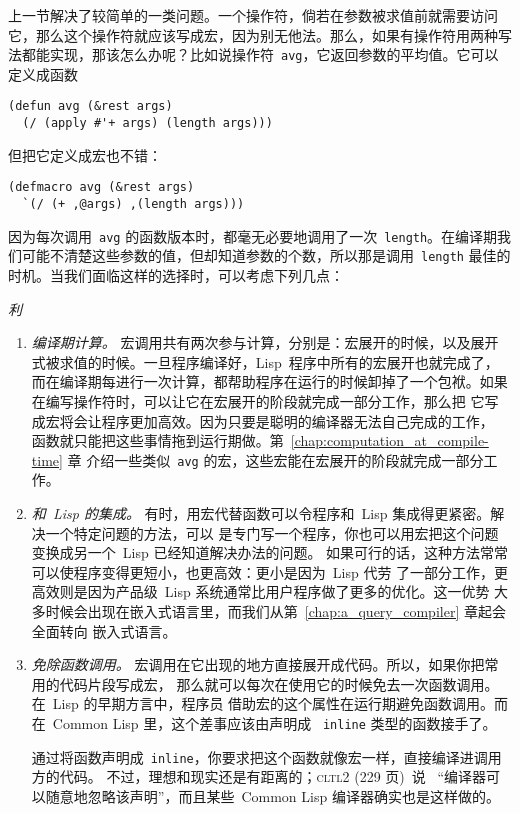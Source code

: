 上一节解决了较简单的一类问题。一个操作符，倘若在参数被求值前就需要访问它，那么这个操作符就应该写成宏，因为别无他法。那么，如果有操作符用两种写法都能实现，那该怎么办呢？比如说操作符~\verb|avg|，它返回参数的平均值。它可以定义成函数
\begin{lstlisting}
(defun avg (&rest args)
  (/ (apply #'+ args) (length args)))
\end{lstlisting}
但把它定义成宏也不错：
\begin{lstlisting}
(defmacro avg (&rest args)
  `(/ (+ ,@args) ,(length args)))
\end{lstlisting}
因为每次调用~\verb|avg| 的函数版本时，都毫无必要地调用了一次~\verb|length|。在编译期我们可能不清楚这些参数的值，但却知道参数的个数，所以那是调用~\verb|length| 最佳的时机。当我们面临这样的选择时，可以考虑下列几点：

\begin{center}\large\textsl{利}\end{center}

\begin{enumerate}
\item \emph{编译期计算。}
  宏调用共有两次参与计算，分别是：宏展开的时候，以及展开式被求值的时候。一旦程序编译好，Lisp~程序中所有的宏展开也就完成了，而在编译期每进行一次计算，都帮助程序在运行的时候卸掉了一个包袱。如果在编写操作符时，可以让它在宏展开的阶段就完成一部分工作，那么把
  它写成宏将会让程序更加高效。因为只要是聪明的编译器无法自己完成的工作，
  函数就只能把这些事情拖到运行期做。第~\ref{chap:computation_at_compile-time} 章
  介绍一些类似~\texttt{avg} 的宏，这些宏能在宏展开的阶段就完成一部分工作。
\item \emph{和~Lisp 的集成。}
  有时，用宏代替函数可以令程序和~Lisp 集成得更紧密。解决一个特定问题的方法，可以
  是专门写一个程序，你也可以用宏把这个问题变换成另一个~Lisp 已经知道解决办法的问题。
  如果可行的话，这种方法常常可以使程序变得更短小，也更高效：更小是因为~Lisp 代劳
  了一部分工作，更高效则是因为产品级~Lisp 系统通常比用户程序做了更多的优化。这一优势
  大多时候会出现在嵌入式语言里，而我们从第~\ref{chap:a_query_compiler} 章起会全面转向
  嵌入式语言。
\item \emph{免除函数调用。}
  宏调用在它出现的地方直接展开成代码。所以，如果你把常用的代码片段写成宏，
  那么就可以每次在使用它的时候免去一次函数调用。在~Lisp 的早期方言中，程序员
  借助宏的这个属性在运行期避免函数调用。而在~Common Lisp 里，这个差事应该由声明成
  ~\texttt{inline} 类型的函数接手了。

  通过将函数声明成~\texttt{inline}，你要求把这个函数就像宏一样，直接编译进调用方的代码。
  不过，理想和现实还是有距离的；\textsc{cltl}2 (229 页)~说
  ~``编译器可以随意地忽略该声明''，而且某些~Common Lisp 编译器确实也是这样做的。
\end{enumerate}

